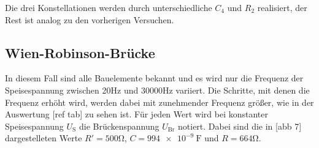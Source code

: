Die drei Konstellationen werden durch unterschiedliche $C_4$ und $R_2$ realisiert, der Rest ist 
analog zu den vorherigen Versuchen.

\subsection{Wien-Robinson-Brücke}
\label{sec:wien}
In diesem Fall sind alle Bauelemente bekannt und es wird nur die Frequenz der Speisespannung
zwischen 20\si{\hertz} und 30000\si{\hertz} variiert. Die Schritte, mit denen die Frequenz erhöht
wird, werden dabei mit zunehmender Frequenz größer, wie in der Auswertung [ref tab] zu sehen ist.
Für jeden Wert wird bei konstanter Speisespannung $U_{\text{S}}$ die Brückenspannung $U_{\text{Br}}$ notiert. 
Dabei sind die in [abb 7] dargestelleten Werte $R'=500\si{\ohm}$, $C=\SI{994e-9}{\farad}$ und $R=664\si{\ohm}$.


